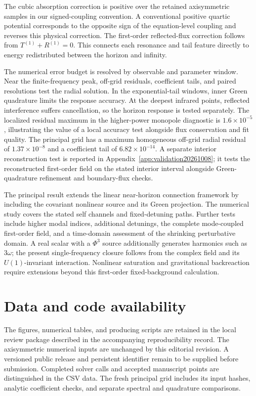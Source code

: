 \documentclass[aps,prd,twocolumn,10pt,nofootinbib,superscriptaddress,floatfix]{revtex4-2}
\begin{document}
The cubic absorption correction is positive over the retained axisymmetric
samples in our signed-coupling convention.  A
conventional positive quartic potential corresponds to the opposite sign of
the equation-level coupling and reverses this physical correction.
The first-order reflected-flux correction follows from
$T^{(1)}+R^{(1)}=0$.  This connects each resonance and tail feature directly
to energy redistributed between the horizon and infinity.

The numerical error budget is resolved by observable and parameter window.
Near the
finite-frequency peak, off-grid residuals, coefficient tails, and paired
resolutions test the radial solution.  In the exponential-tail windows,
inner Green quadrature limits the response accuracy.  At the deepest
infrared points, reflected interference suffers cancellation, so the
horizon response is tested separately.  The localized residual maximum in
the higher-power monopole diagnostic is $1.6\times10^{-5}$, illustrating
the value of a local accuracy test alongside flux conservation and fit
quality.  The principal grid has a maximum homogeneous off-grid radial
residual of $1.37\times10^{-8}$ and a coefficient tail of
$6.82\times10^{-14}$.  A separate
interior reconstruction test is reported in Appendix~\ref{app:validation20261008};
it tests the reconstructed first-order field on the stated interior interval
alongside Green-quadrature refinement and boundary-flux checks.

The principal result extends the linear near-horizon connection framework
\cite{BredbergKerrCFT2010} by including the covariant nonlinear source and
its Green projection.  The numerical study covers the stated self channels
and fixed-detuning paths.  Further tests include higher modal indices,
additional detunings, the complete mode-coupled first-order field, and a
time-domain assessment of the shrinking perturbative domain.  A real
scalar with a $\Phi^3$ source additionally generates harmonics such as
$3\omega$; the present single-frequency closure follows from the complex
field and its $U(1)$-invariant interaction.  Nonlinear saturation and
gravitational backreaction require extensions beyond this first-order
fixed-background calculation.

\section*{Data and code availability}

The figures, numerical tables, and producing scripts are retained in the
local review package described in the accompanying reproducibility record.
The axisymmetric numerical inputs are unchanged by this editorial revision.
A versioned public release and persistent identifier remain to be supplied
before submission.
Completed solver calls and accepted manuscript points are distinguished in
the CSV data.  The fresh principal grid includes its input hashes, analytic
coefficient checks, and separate spectral and quadrature comparisons.
\end{document}
